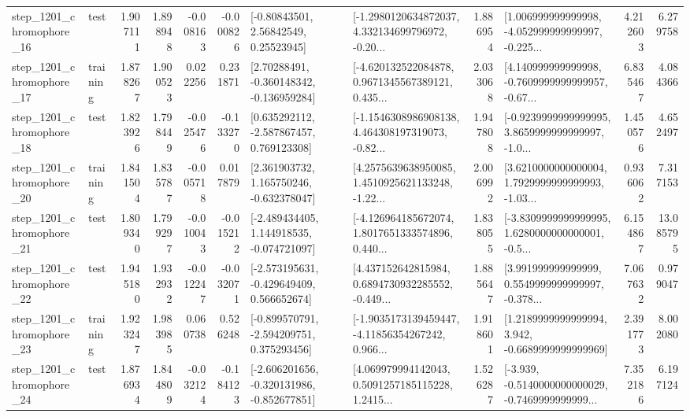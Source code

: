 \begin{tabular}{llrrrrllrlrr}
 step\_1201\_chromophore\_16 &      test &      1.907111 &    1.898948 &     -0.008163 & -0.000826 &       [-0.80843501, 2.56842549, 0.25523945] &  [-1.2980120634872037, 4.332134699796972, -0.20... &       1.886954 &  [1.006999999999998, -4.052999999999997, -0.225... &            4.212603 &          6.279758 \\
 step\_1201\_chromophore\_17 &  training &      1.878267 &    1.900523 &      0.022256 &  0.231871 &    [2.70288491, -0.360148342, -0.136959284] &  [-4.620132522084878, 0.9671345567389121, 0.435... &       2.033068 &  [4.140999999999998, -0.7609999999999957, -0.67... &            6.835467 &          4.084366 \\
 step\_1201\_chromophore\_18 &      test &      1.823926 &    1.798449 &     -0.025476 & -0.133270 &    [0.635292112, -2.587867457, 0.769123308] &  [-1.1546308986908138, 4.464308197319073, -0.82... &       1.947808 &  [-0.9239999999999995, 3.8659999999999997, -1.0... &            1.450576 &          4.652497 \\
 step\_1201\_chromophore\_20 &  training &      1.841504 &    1.835787 &     -0.005718 &  0.017879 &    [2.361903732, 1.165750246, -0.632378047] &  [4.2575639638950085, 1.4510925621133248, -1.22... &       2.006992 &  [3.6210000000000004, 1.7929999999999993, -1.03... &            0.936062 &          7.317153 \\
 step\_1201\_chromophore\_21 &      test &      1.809340 &    1.799297 &     -0.010043 & -0.015212 &   [-2.489434405, 1.144918535, -0.074721097] &  [-4.126964185672074, 1.8017651333574896, 0.440... &       1.838055 &  [-3.8309999999999995, 1.6280000000000001, -0.5... &            6.154867 &         13.085795 \\
 step\_1201\_chromophore\_22 &      test &      1.945180 &    1.932932 &     -0.012247 & -0.032071 &   [-2.573195631, -0.429649409, 0.566652674] &  [4.437152642815984, 0.6894730932285552, -0.449... &       1.885647 &  [3.991999999999999, 0.5549999999999997, -0.378... &            7.067632 &          0.979047 \\
 step\_1201\_chromophore\_23 &  training &      1.923247 &    1.983985 &      0.060738 &  0.526248 &   [-0.899570791, -2.594209751, 0.375293456] &  [-1.9035173139459447, -4.11856354267242, 0.966... &       1.918601 &   [1.2189999999999994, 3.942, -0.6689999999999969] &            2.391773 &          8.002080 \\
 step\_1201\_chromophore\_24 &      test &      1.876934 &    1.844809 &     -0.032124 & -0.184123 &  [-2.606201656, -0.320131986, -0.852677851] &  [4.069979994142043, 0.5091257185115228, 1.2415... &       1.526287 &  [-3.939, -0.5140000000000029, -0.7469999999999... &            7.352186 &          6.197124 \\

\end{tabular}
